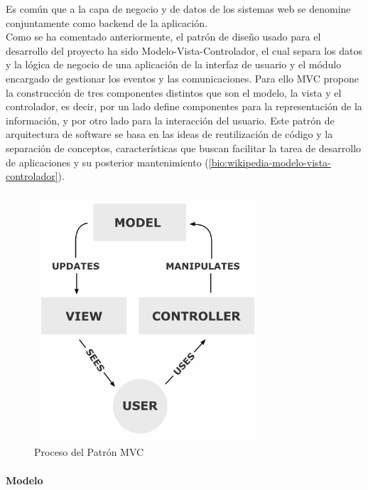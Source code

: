 Es común que a la capa de negocio y de datos de los sistemas web se denomine conjuntamente como backend de la aplicación.\\

Como se ha comentado anteriormente, el patrón de diseño usado para el desarrollo del proyecto ha sido Modelo-Vista-Controlador, el cual separa los datos y la lógica de negocio de una aplicación de la interfaz de usuario y el módulo encargado de gestionar los eventos y las comunicaciones. Para ello MVC propone la construcción de tres componentes distintos que son el modelo, la vista y el controlador, es decir, por un lado define componentes para la representación de la información, y por otro lado para la interacción del usuario.​ Este patrón de arquitectura de software se basa en las ideas de reutilización de código y la separación de conceptos, características que buscan facilitar la tarea de desarrollo de aplicaciones y su posterior mantenimiento (\ref{bio:wikipedia-modelo-vista-controlador}).

\vspace{10mm}

\begin{figure}[H]
\centering
  \includegraphics[scale=.55]{img/proceso-MVC.jpg}
  \caption{Proceso del Patrón MVC}
  \label{fig:proceso-MVC}
\end{figure}

\vspace{10mm}

\paragraph*{Modelo}

